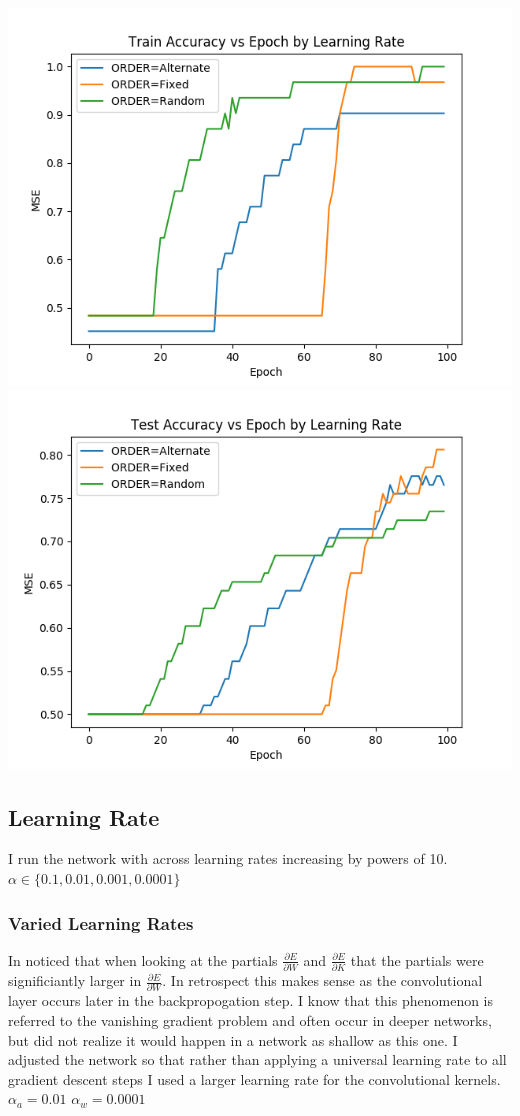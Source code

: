 \documentclass{article}
\begin{document}
\includegraphics[scale=.5]{Pictures/part2/OrderTrainAccuracy}
\includegraphics[scale=.5]{Pictures/part2/OrderTestAccuracy}

	
\subsection{Learning Rate}
I run the network with across learning rates increasing by powers of 10.
$\alpha \in \{0.1, 0.01, 0.001, 0.0001\}$

\subsubsection{Varied Learning Rates}
In noticed that when looking at the partials $\frac{\partial E}{\partial W}$ and $\frac{\partial E}{\partial K}$ that the partials were significiantly larger in $\frac{\partial E}{\partial W}$.  In retrospect this makes sense as the convolutional layer occurs later in the backpropogation step.  I know that this phenomenon is referred to the vanishing gradient problem and often occur in deeper networks, but did not realize it would happen in a network as shallow as this one.  I adjusted the network so that rather than applying a universal learning rate to all gradient descent steps I used a larger learning rate for the convolutional kernels.
$\alpha_a = 0.01$ $\alpha_w = 0.0001$
\end{document}
